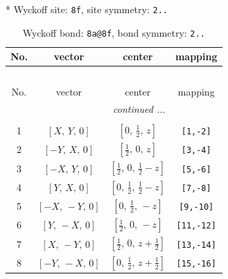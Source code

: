 \documentclass[fleqn,8pt]{jsarticle}
\begin{document}
* Wyckoff site: {\tt 8f}, site symmetry: {\tt 2..}
\renewcommand{\arraystretch}{1.2}
\begin{longtable}{cccc}
\caption{Wyckoff bond: {\tt 8a@8f}, bond symmetry: {\tt 2..}}
 \\
 \hline \hline
No. & vector & center & mapping \\ \hline \endfirsthead

\multicolumn{3}{l}{\tablename\ \thetable{}} \\
 \hline \hline
No. & vector & center & mapping \\ \hline \endhead

 \hline \hline
\multicolumn{3}{r}{\footnotesize\it continued ...} \\ \endfoot

 \hline \hline
\multicolumn{3}{r}{} \\ \endlastfoot

1 & $\left[ X,\, Y,\, 0 \right]$ & $\left[ 0,\, \frac{1}{2},\, z \right]$ & {\tt [1,-2]} \\ \hline
2 & $\left[ - Y,\, X,\, 0 \right]$ & $\left[ \frac{1}{2},\, 0,\, z \right]$ & {\tt [3,-4]} \\ \hline
3 & $\left[ - X,\, Y,\, 0 \right]$ & $\left[ \frac{1}{2},\, 0,\, \frac{1}{2} - z \right]$ & {\tt [5,-6]} \\ \hline
4 & $\left[ Y,\, X,\, 0 \right]$ & $\left[ 0,\, \frac{1}{2},\, \frac{1}{2} - z \right]$ & {\tt [7,-8]} \\ \hline
5 & $\left[ - X,\, - Y,\, 0 \right]$ & $\left[ 0,\, \frac{1}{2},\, - z \right]$ & {\tt [9,-10]} \\ \hline
6 & $\left[ Y,\, - X,\, 0 \right]$ & $\left[ \frac{1}{2},\, 0,\, - z \right]$ & {\tt [11,-12]} \\ \hline
7 & $\left[ X,\, - Y,\, 0 \right]$ & $\left[ \frac{1}{2},\, 0,\, z + \frac{1}{2} \right]$ & {\tt [13,-14]} \\ \hline
8 & $\left[ - Y,\, - X,\, 0 \right]$ & $\left[ 0,\, \frac{1}{2},\, z + \frac{1}{2} \right]$ & {\tt [15,-16]} \\
\end{longtable}
\renewcommand{\arraystretch}{1.2}
\end{document}
